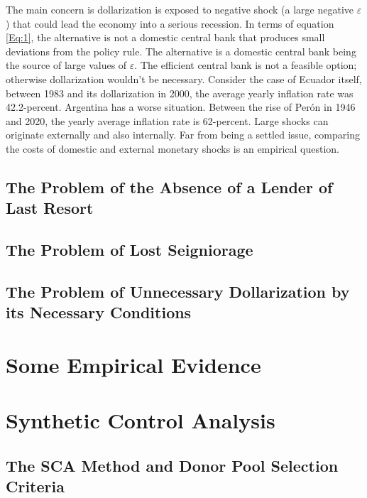 \documentclass[12pt]{article}
\begin{document}
The main concern is dollarization is exposed to negative shock (a large negative $\varepsilon$) that could lead the economy into a serious recession. In terms of equation \ref{Eq:1}, the alternative is not a domestic central bank that produces small deviations from the policy rule. The alternative is a domestic central bank being the source of large values of $\varepsilon$. The efficient central bank is not a feasible option; otherwise dollarization wouldn't be necessary. Consider the case of Ecuador itself, between 1983 and its dollarization in 2000, the average yearly inflation rate was 42.2-percent. Argentina has a worse situation. Between the rise of Perón in 1946 and 2020, the yearly average inflation rate is 62-percent. Large shocks can originate externally and also internally. Far from being a settled issue, comparing the costs of domestic and external monetary shocks is an empirical question.

\subsection{The Problem of the Absence of a Lender of Last Resort}

\subsection{The Problem of Lost Seigniorage}

\subsection{The Problem of Unnecessary Dollarization by its Necessary Conditions}


\section{Some Empirical Evidence}

\section{Synthetic Control Analysis}

\subsection{The SCA Method and Donor Pool Selection Criteria}
\end{document}

